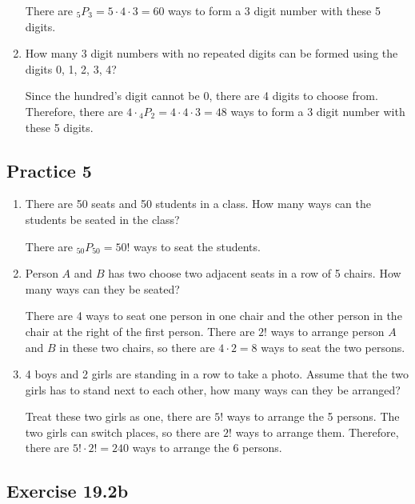 \documentclass{report}
\newcommand\permtwo[2][^n]{{}_{#1}P_{#2}}
\begin{document}
\begin{multicols}{2}
\begin{enumerate}
          There are $\permtwo[5]{3} = 5 \cdot 4 \cdot 3 = 60$ ways to form a 3 digit
          number with these 5 digits.

    \item How many 3 digit numbers with no repeated digits can be formed using the digits
          0, 1, 2, 3, 4? \sol{}

          Since the hundred's digit cannot be 0, there are 4 digits to choose from.
          Therefore, there are $4 \cdot \permtwo[4]{2} = 4 \cdot 4 \cdot 3 = 48$ ways to
          form a 3 digit number with these 5 digits.
  \end{enumerate}

  \subsection{Practice 5}
  \begin{enumerate}
    \item There are 50 seats and 50 students in a class. How many ways can the students
          be seated in the class? \sol{}

          There are $\permtwo[50]{50} = 50!$ ways to seat the students.

    \item Person $A$ and $B$ has two choose two adjacent seats in a row of 5 chairs. How
          many ways can they be seated? \sol{}

          There are 4 ways to seat one person in one chair and the other person in the
          chair at the right of the first person. There are $2!$ ways to arrange person
          $A$ and $B$ in these two chairs, so there are $4 \cdot 2 = 8$ ways to seat the
          two persons.

    \item 4 boys and 2 girls are standing in a row to take a photo. Assume that the two girls has to stand next to each other, how many ways can they be arranged?
          \sol{}

          Treat these two girls as one, there are $5!$ ways to arrange the 5 persons. The
          two girls can switch places, so there are $2!$ ways to arrange them. Therefore,
          there are $5! \cdot 2! = 240$ ways to arrange the 6 persons.
  \end{enumerate}

  \subsection{Exercise 19.2b}


\end{multicols}
\end{document}
